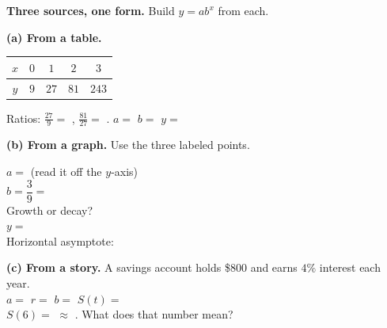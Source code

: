 \documentclass[10pt]{article}
\newcommand{\lgrid}[4]{%
  \draw[step=1, linegray!40, very thin] (#1,#3) grid (#2,#4);
  \draw[->, semithick, charcoal] (#1,0)--(#2,0) node[below right, font=\scriptsize]{$x$};
  \draw[->, semithick, charcoal] (0,#3)--(0,#4) node[left, font=\scriptsize]{$y$};}
\newcommand{\expcurve}[4]{\draw[very thick, forest, domain=#3:#4, samples=120, smooth]
  plot (\x,{#1*exp((#2)*(\x))});}
\begin{document}
\begin{tcolorbox}[colback=white, colframe=black!40, title=\textbf{Tier A --- Approaching Proficiency},
    fonttitle=\bfseries, arc=1.5mm, left=3mm, right=3mm, top=2mm, bottom=2mm, breakable]
\textbf{Three sources, one form.} Build $y=ab^{x}$ from each.

\vspace{5pt}
\textbf{(a) From a table.}
\begin{center}
\renewcommand{\arraystretch}{1.25}
\begin{tabular}{|c|c|c|c|c|}
\hline
$x$ & $0$ & $1$ & $2$ & $3$ \\ \hline
$y$ & $9$ & $27$ & $81$ & $243$ \\ \hline
\end{tabular}
\end{center}
Ratios: $\frac{27}{9}=$ \blank{1.0cm}, \; $\frac{81}{27}=$ \blank{1.0cm}. \quad
$a=$ \blank{1.4cm} \quad $b=$ \blank{1.4cm} \quad $y=$ \blank{2.8cm}

\vspace{6pt}
\textbf{(b) From a graph.} Use the three labeled points.
\begin{center}
\begin{minipage}[c]{0.44\linewidth}
\centering
{}
\end{minipage}
\begin{minipage}[c]{0.52\linewidth}
$a=$ \blank{1.8cm} \; (read it off the $y$-axis) \\[6pt]
$b=\dfrac{3}{9}=$ \blank{1.4cm} \\[6pt]
Growth or decay? \blank{2.2cm} \\[6pt]
$y=$ \blank{3.0cm} \\[6pt]
Horizontal asymptote: \blank{2.0cm}
\end{minipage}
\end{center}

\vspace{4pt}
\textbf{(c) From a story.} A savings account holds \$$800$ and earns $4\%$ interest each year.
\\[3pt]
$a=$ \blank{1.6cm} \quad $r=$ \blank{1.4cm} \quad $b=$ \blank{1.6cm} \quad
$S(t)=$ \blank{3.2cm} \\[3pt]
$S(6)=$ \blank{2.6cm} $\approx$ \blank{2.0cm}. \; What does that number mean?
\blank{5.0cm}


\end{tcolorbox}
\end{document}
